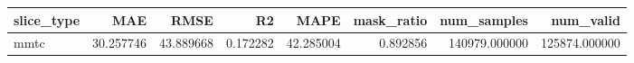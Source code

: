 \begin{tabular}{lrrrrrrr}
\toprule
slice_type & MAE & RMSE & R2 & MAPE & mask_ratio & num_samples & num_valid \\
\midrule
mmtc & 30.257746 & 43.889668 & 0.172282 & 42.285004 & 0.892856 & 140979.000000 & 125874.000000 \\
\bottomrule
\end{tabular}
